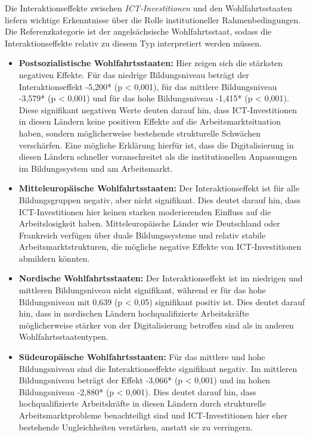 Die Interaktionseffekte zwischen \textit{\ac{ICT}-Investitionen} und den 
Wohlfahrtsstaaten liefern wichtige Erkenntnisse über die Rolle institutioneller 
Rahmenbedingungen. Die Referenzkategorie ist der angelsächsische Wohlfahrtsstaat, sodass 
die Interaktionseffekte relativ zu diesem Typ interpretiert werden müssen.

\begin{itemize}
    \item \textbf{Postsozialistische Wohlfahrtsstaaten:} Hier zeigen sich 
    die stärksten negativen Effekte. Für das niedrige Bildungsniveau beträgt der 
    Interaktionseffekt -5,200* (p < 0,001), für das mittlere Bildungsniveau -3,579* 
    (p < 0,001) und für das hohe Bildungsniveau -1,415* (p < 0,001). Diese signifikant 
    negativen Werte deuten darauf hin, dass ICT-Investitionen in diesen Ländern keine positiven 
    Effekte auf die Arbeitsmarktsituation haben, sondern möglicherweise bestehende 
    strukturelle Schwächen verschärfen. Eine mögliche Erklärung hierfür ist, dass die 
    Digitalisierung in diesen Ländern schneller voranschreitet als die institutionellen 
    Anpassungen im Bildungssystem und am Arbeitsmarkt.
    
    \item \textbf{Mitteleuropäische Wohlfahrtsstaaten:} Der Interaktionseffekt ist für alle 
    Bildungsgruppen negativ, aber nicht signifikant. Dies deutet darauf hin, dass 
    ICT-Investitionen hier keinen starken moderierenden Einfluss auf die Arbeitslosigkeit 
    haben. Mitteleuropäische Länder wie Deutschland oder Frankreich verfügen über 
    duale Bildungssysteme und relativ stabile Arbeitsmarktstrukturen, die mögliche 
    negative Effekte von ICT-Investitionen abmildern könnten.
    
    \item \textbf{Nordische Wohlfahrtsstaaten:} Der Interaktionseffekt ist im niedrigen und mittleren 
    Bildungsniveau nicht signifikant, während er für das hohe Bildungsniveau mit 0,639 (p < 0,05) 
    signifikant positiv ist. Dies deutet darauf hin, dass in nordischen Ländern hochqualifizierte 
    Arbeitskräfte möglicherweise stärker von der Digitalisierung betroffen sind als in anderen 
    Wohlfahrtsstaatentypen.
    
    \item \textbf{Südeuropäische Wohlfahrtsstaaten:} Für das mittlere und hohe Bildungsniveau sind die 
    Interaktionseffekte signifikant negativ. Im mittleren Bildungsniveau beträgt der Effekt 
    -3,066* (p < 0,001) und im hohen Bildungsniveau -2,880* (p < 0,001). Dies deutet darauf hin, 
    dass hochqualifizierte Arbeitskräfte in diesen Ländern durch strukturelle Arbeitsmarktprobleme 
    benachteiligt sind und ICT-Investitionen hier eher bestehende Ungleichheiten verstärken, anstatt 
    sie zu verringern.
\end{itemize}

